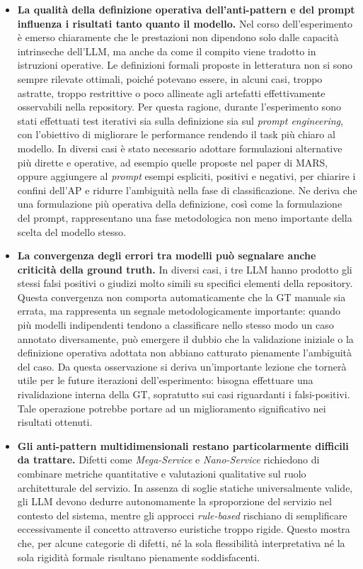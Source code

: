 \begin{itemize}
    \item \textbf{La qualità della definizione operativa dell’anti-pattern e del prompt influenza i risultati tanto quanto il modello.}  
    Nel corso dell’esperimento è emerso chiaramente che le prestazioni non dipendono solo dalle capacità intrinseche dell’LLM, ma anche da come il compito viene tradotto in istruzioni operative. Le definizioni formali proposte in letteratura non si sono sempre rilevate ottimali, poiché potevano essere, in alcuni casi, troppo astratte, troppo restrittive o poco allineate agli artefatti effettivamente osservabili nella repository. Per questa ragione, durante l’esperimento sono stati effettuati test iterativi sia sulla definizione sia sul \textit{prompt engineering}, con l’obiettivo di migliorare le performance rendendo il task più chiaro al modello. In diversi casi è stato necessario adottare formulazioni alternative più dirette e operative, ad esempio quelle proposte nel paper di MARS, oppure aggiungere al \textit{prompt} esempi espliciti, positivi e negativi, per chiarire i confini dell’AP e ridurre l’ambiguità nella fase di classificazione. 
    Ne deriva che una formulazione più operativa della definizione, così come la formulazione del prompt, rappresentano una fase metodologica non meno importante della scelta del modello stesso.

    
    \item \textbf{La convergenza degli errori tra modelli può segnalare anche criticità della ground truth.}  
    In diversi casi, i tre LLM hanno prodotto gli stessi falsi positivi o giudizi molto simili su specifici elementi della repository. Questa convergenza non comporta automaticamente che la GT manuale sia errata, ma rappresenta un segnale metodologicamente importante: quando più modelli indipendenti tendono a classificare nello stesso modo un caso annotato diversamente, può emergere il dubbio che la validazione iniziale o la definizione operativa adottata non abbiano catturato pienamente l’ambiguità del caso. 
    Da questa osservazione si deriva un'importante lezione che tornerà utile per le future iterazioni dell'esperimento: bisogna effettuare una rivalidazione interna della GT, sopratutto sui casi riguardanti i falsi-positivi. Tale operazione potrebbe portare ad un miglioramento significativo nei risultati ottenuti.
    

    \item \textbf{Gli anti-pattern multidimensionali restano particolarmente difficili da trattare.}  
    Difetti come \textit{Mega-Service} e \textit{Nano-Service} richiedono di combinare metriche quantitative e valutazioni qualitative sul ruolo architetturale del servizio. In assenza di soglie statiche universalmente valide, gli LLM devono dedurre autonomamente la sproporzione del servizio nel contesto del sistema, mentre gli approcci \textit{rule-based} rischiano di semplificare eccessivamente il concetto attraverso euristiche troppo rigide. Questo mostra che, per alcune categorie di difetti, né la sola flessibilità interpretativa né la sola rigidità formale risultano pienamente soddisfacenti.


\end{itemize}
